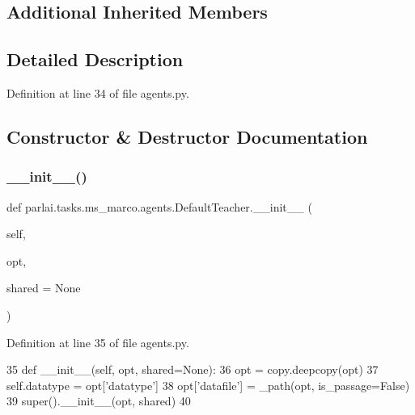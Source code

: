 \subsection*{Additional Inherited Members}


\subsection{Detailed Description}


Definition at line 34 of file agents.\+py.



\subsection{Constructor \& Destructor Documentation}
\mbox{\label{classparlai_1_1tasks_1_1ms__marco_1_1agents_1_1DefaultTeacher_a0363814798100d63ef899b4de3de82d9}} 
\subsubsection{\texorpdfstring{\+\_\+\+\_\+init\+\_\+\+\_\+()}{\_\_init\_\_()}}
{\footnotesize\ttfamily def parlai.\+tasks.\+ms\+\_\+marco.\+agents.\+Default\+Teacher.\+\_\+\+\_\+init\+\_\+\+\_\+ (\begin{DoxyParamCaption}\item[{}]{self,  }\item[{}]{opt,  }\item[{}]{shared = {\ttfamily None} }\end{DoxyParamCaption})}



Definition at line 35 of file agents.\+py.


\begin{DoxyCode}
35     \textcolor{keyword}{def }\_\_init\_\_(self, opt, shared=None):
36         opt = copy.deepcopy(opt)
37         self.datatype = opt[\textcolor{stringliteral}{'datatype'}]
38         opt[\textcolor{stringliteral}{'datafile'}] = \_path(opt, is\_passage=\textcolor{keyword}{False})
39         super().\_\_init\_\_(opt, shared)
40 
\end{DoxyCode}


